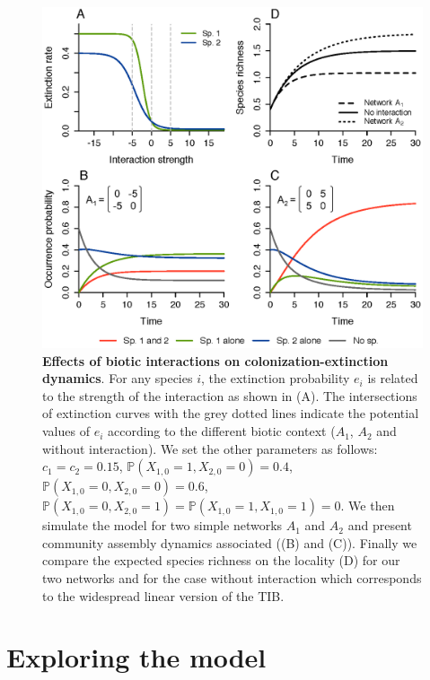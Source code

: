 \begin{figure}[h!]
\centering
\includegraphics[width=\textwidth]{./chapitre1/fig2.eps}
\caption[Effects of biotic interactions on colonization-extinction dynamics]{\textbf{Effects of biotic interactions on colonization-extinction dynamics}. For any species $i$, the extinction probability $e_i$ is related to the strength of the interaction as shown in (A). The intersections of extinction curves with the grey dotted lines indicate the potential values of $e_i$ according to the different biotic context ($A_1$, $A_2$ and without interaction). We set the other parameters as follows: $c_1=c_2=0.15$, $\mathbb{P}(X_{1,0}=1 , X_{2,0}=0)=0.4$, $\mathbb{P}(X_{1,0}=0 , X_{2,0}=0)=0.6$, $\mathbb{P}(X_{1,0}=0 , X_{2,0}=1)=\mathbb{P}(X_{1,0}=1 , X_{1,0}=1)=0$. We then simulate the model for two simple networks $A_1$ and $A_2$ and present community assembly dynamics associated ((B) and (C)). Finally we compare the expected species richness on the locality (D) for our two networks and for the case without interaction which corresponds to the widespread linear version of the TIB.}
\label{chap1fig2}
\end{figure}

\section{Exploring the model}

